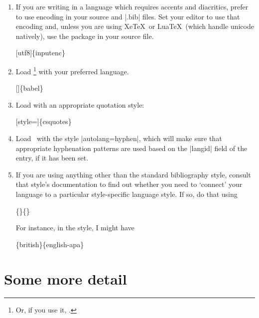 \begin{enumerate}
 \item If you are writing in a language which requires accents and diacritics, prefer to use  encoding in your source and |.bib| files. Set your editor to use that encoding and, unless you are using Xe\TeX\ or Lua\TeX\ (which handle unicode natively), use the  package in your source file.
 \begin{pseudoverb}
 [utf8]\{inputenc\}
 \end{pseudoverb}
 \item Load \footnote{Or, if you use it, .} with your preferred language.
 \begin{pseudoverb}
 []\{babel\}
 \end{pseudoverb}
 \item Load  with an appropriate quotation style:
 \begin{pseudoverb}
 [style=]\{csquotes\}
 \end{pseudoverb}
 \item Load \biblatex\ with the style |autolang=hyphen|, which will make sure that appropriate hyphenation patterns are used based on the |langid| field of the entry, if it has been set.
 \item If you are using anything other than the standard bibliography style, consult that style's documentation to find out whether you need to `connect' your language to a particular style-specific language style. If so, do that using
 \begin{pseudoverb}
 \{\}\{\}
 \end{pseudoverb}
 For instance, in the  style, I might have
 \begin{pseudoverb}
 \{british\}\{english-apa\}
 \end{pseudoverb}
\end{enumerate}

\section{Some more detail}

